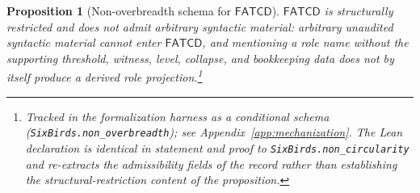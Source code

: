 \documentclass[11pt]{article}
\newtheorem{proposition}[theorem]{Proposition}
\theoremstyle{definition}
\newcommand{\FATCD}{\ensuremath{\mathsf{FATCD}}}
\begin{document}
\begin{proposition}[Non-overbreadth schema for \FATCD{}]\label{prop:non-overbreadth}
\FATCD{} is structurally restricted and does not admit arbitrary
syntactic material: arbitrary unaudited syntactic material cannot enter
\FATCD{}, and mentioning a role name without the supporting threshold,
witness, level, collapse, and bookkeeping data does not by itself produce a
derived role projection.\footnote{Tracked in the formalization harness as a conditional schema (\texttt{SixBirds.non\_overbreadth}); see Appendix~\ref{app:mechanization}. The Lean declaration is identical in statement and proof to \texttt{SixBirds.non\_circularity} and re-extracts the admissibility fields of the record rather than establishing the structural-restriction content of the proposition.}
\end{proposition}
\end{document}
